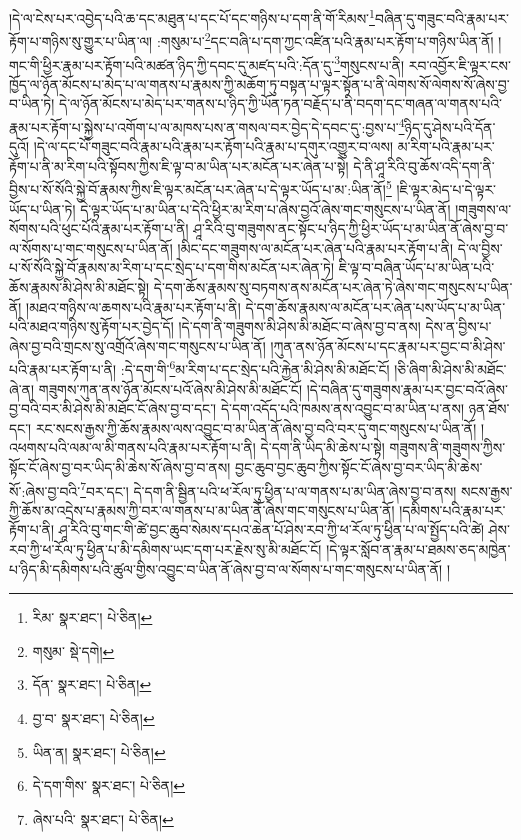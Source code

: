 །དེ་ལ་ངེས་པར་འབྱེད་པའི་ཆ་དང་མཐུན་པ་དང་པོ་དང་གཉིས་པ་དག་ནི་གོ་རིམས་\footnote{རིམ་  སྣར་ཐང་།  པེ་ཅིན། }བཞིན་དུ་གཟུང་བའི་རྣམ་པར་རྟོག་པ་གཉིས་སུ་གྱུར་པ་ཡིན་ལ། :གསུམ་པ་\footnote{གསུམ་  སྡེ་དགེ། }དང་བཞི་པ་དག་ཀྱང་འཛིན་པའི་རྣམ་པར་རྟོག་པ་གཉིས་ཡིན་ནོ། །གང་གི་ཕྱིར་རྣམ་པར་རྟོག་པའི་མཚན་ཉིད་ཀྱི་དབང་དུ་མཛད་པའི་:དོན་དུ་\footnote{དོན་  སྣར་ཐང་།  པེ་ཅིན། }གསུངས་པ་ནི། རབ་འབྱོར་ཇི་ལྟར་ངས་ཁྱོད་ལ་ཉོན་མོངས་པ་མེད་པ་ལ་གནས་པ་རྣམས་ཀྱི་མཆོག་ཏུ་བསྟན་པ་ལྟར་སྟོན་པ་ནི་ལེགས་སོ་ལེགས་སོ་ཞེས་བྱ་བ་ཡིན་ཏེ། དེ་ལ་ཉོན་མོངས་པ་མེད་པར་གནས་པ་ཉིད་ཀྱི་ཡོན་ཏན་བརྗོད་པ་ནི་བདག་དང་གཞན་ལ་གནས་པའི་རྣམ་པར་རྟོག་པ་སྐྱེས་པ་འགོག་པ་ལ་མཁས་པས་ན་གསལ་བར་བྱེད་དེ་དབང་དུ་:བྱས་པ་\footnote{བྱ་བ་  སྣར་ཐང་།  པེ་ཅིན། }ཉིད་དུ་ཤེས་པའི་དོན་དུའོ། །དེ་ལ་དང་པོ་གཟུང་བའི་རྣམ་པའི་རྣམ་པར་རྟོག་པའི་རྣམ་པ་དགུར་འགྱུར་བ་ལས། མ་རིག་པའི་རྣམ་པར་རྟོག་པ་ནི་མ་རིག་པའི་སྟོབས་ཀྱིས་ཇི་ལྟ་བ་མ་ཡིན་པར་མངོན་པར་ཞེན་པ་སྟེ། དེ་ནི་ཤཱ་རིའི་བུ་ཆོས་འདི་དག་ནི་བྱིས་པ་སོ་སོའི་སྐྱེ་བོ་རྣམས་ཀྱིས་ཇི་ལྟར་མངོན་པར་ཞེན་པ་དེ་ལྟར་ཡོད་པ་མ་:ཡིན་ནོ།\footnote{ཡིན་ན།  སྣར་ཐང་།  པེ་ཅིན། } །ཇི་ལྟར་མེད་པ་དེ་ལྟར་ཡོད་པ་ཡིན་ཏེ། དེ་ལྟར་ཡོད་པ་མ་ཡིན་པ་དེའི་ཕྱིར་མ་རིག་པ་ཞེས་བྱའོ་ཞེས་གང་གསུངས་པ་ཡིན་ནོ། །གཟུགས་ལ་སོགས་པའི་ཕུང་པོའི་རྣམ་པར་རྟོག་པ་ནི། ཤཱ་རིའི་བུ་གཟུགས་ནང་སྟོང་པ་ཉིད་ཀྱི་ཕྱིར་ཡོད་པ་མ་ཡིན་ནོ་ཞེས་བྱ་བ་ལ་སོགས་པ་གང་གསུངས་པ་ཡིན་ནོ། །མིང་དང་གཟུགས་ལ་མངོན་པར་ཞེན་པའི་རྣམ་པར་རྟོག་པ་ནི། དེ་ལ་བྱིས་པ་སོ་སོའི་སྐྱེ་བོ་རྣམས་མ་རིག་པ་དང་སྲེད་པ་དག་གིས་མངོན་པར་ཞེན་ཏེ། ཇི་ལྟ་བ་བཞིན་ཡོད་པ་མ་ཡིན་པའི་ཆོས་རྣམས་མི་ཤེས་མི་མཐོང་སྟེ། དེ་དག་ཆོས་རྣམས་སུ་བཏགས་ནས་མངོན་པར་ཞེན་ཏེ་ཞེས་གང་གསུངས་པ་ཡིན་ནོ། །མཐའ་གཉིས་ལ་ཆགས་པའི་རྣམ་པར་རྟོག་པ་ནི། དེ་དག་ཆོས་རྣམས་ལ་མངོན་པར་ཞེན་པས་ཡོད་པ་མ་ཡིན་པའི་མཐའ་གཉིས་སུ་རྟོག་པར་བྱེད་དོ། །དེ་དག་ནི་གཟུགས་མི་ཤེས་མི་མཐོང་བ་ཞེས་བྱ་བ་ནས། དེས་ན་བྱིས་པ་ཞེས་བྱ་བའི་གྲངས་སུ་འགྲོའོ་ཞེས་གང་གསུངས་པ་ཡིན་ནོ། །ཀུན་ནས་ཉོན་མོངས་པ་དང་རྣམ་པར་བྱང་བ་མི་ཤེས་པའི་རྣམ་པར་རྟོག་པ་ནི། :དེ་དག་གི་\footnote{དེ་དག་གིས་  སྣར་ཐང་།  པེ་ཅིན། }མ་རིག་པ་དང་སྲེད་པའི་རྐྱེན་མི་ཤེས་མི་མཐོང་ངོ། །ཅི་ཞིག་མི་ཤེས་མི་མཐོང་ཞེ་ན། གཟུགས་ཀུན་ནས་ཉོན་མོངས་པའོ་ཞེས་མི་ཤེས་མི་མཐོང་ངོ། །དེ་བཞིན་དུ་གཟུགས་རྣམ་པར་བྱང་བའོ་ཞེས་བྱ་བའི་བར་མི་ཤེས་མི་མཐོང་ངོ་ཞེས་བྱ་བ་དང་། དེ་དག་འདོད་པའི་ཁམས་ནས་འབྱུང་བ་མ་ཡིན་པ་ནས། ཉན་ཐོས་དང་། རང་སངས་རྒྱས་ཀྱི་ཆོས་རྣམས་ལས་འབྱུང་བ་མ་ཡིན་ནོ་ཞེས་བྱ་བའི་བར་དུ་གང་གསུངས་པ་ཡིན་ནོ། །འཕགས་པའི་ལམ་ལ་མི་གནས་པའི་རྣམ་པར་རྟོག་པ་ནི། དེ་དག་ནི་ཡིད་མི་ཆེས་པ་སྟེ། གཟུགས་ནི་གཟུགས་ཀྱིས་སྟོང་ངོ་ཞེས་བྱ་བར་ཡིད་མི་ཆེས་སོ་ཞེས་བྱ་བ་ནས། བྱང་ཆུབ་བྱང་ཆུབ་ཀྱིས་སྟོང་ངོ་ཞེས་བྱ་བར་ཡིད་མི་ཆེས་སོ་:ཞེས་བྱ་བའི་\footnote{ཞེས་པའི་  སྣར་ཐང་།  པེ་ཅིན། }བར་དང་། དེ་དག་ནི་སྦྱིན་པའི་ཕ་རོལ་ཏུ་ཕྱིན་པ་ལ་གནས་པ་མ་ཡིན་ཞེས་བྱ་བ་ནས། སངས་རྒྱས་ཀྱི་ཆོས་མ་འདྲེས་པ་རྣམས་ཀྱི་བར་ལ་གནས་པ་མ་ཡིན་ནོ་ཞེས་གང་གསུངས་པ་ཡིན་ནོ། །དམིགས་པའི་རྣམ་པར་རྟོག་པ་ནི། ཤཱ་རིའི་བུ་གང་གི་ཚེ་བྱང་ཆུབ་སེམས་དཔའ་ཆེན་པོ་ཤེས་རབ་ཀྱི་ཕ་རོལ་ཏུ་ཕྱིན་པ་ལ་སྤྱོད་པའི་ཚེ། ཤེས་རབ་ཀྱི་ཕ་རོལ་ཏུ་ཕྱིན་པ་མི་དམིགས་ཡང་དག་པར་རྗེས་སུ་མི་མཐོང་ངོ། །དེ་ལྟར་སློབ་ན་རྣམ་པ་ཐམས་ཅད་མཁྱེན་པ་ཉིད་མི་དམིགས་པའི་ཚུལ་གྱིས་འབྱུང་བ་ཡིན་ནོ་ཞེས་བྱ་བ་ལ་སོགས་པ་གང་གསུངས་པ་ཡིན་ནོ། །
